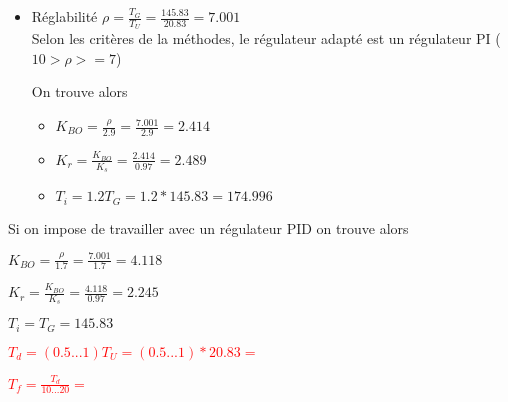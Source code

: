 \begin{itemize}
\item Réglabilité $\rho = \frac{T_{G}}{T_{U}} = \frac{145.83}{20.83} = 7.001$\\
Selon les critères de la méthodes, le régulateur adapté est un régulateur PI ($10 > \rho >= 7$)

On trouve alors 
\begin{itemize}
\item $K_{BO} = \frac{\rho}{2.9} = \frac{7.001}{2.9} = 2.414$
\item $K_{r} = \frac{K_{BO}}{K_{s}} = \frac{2.414}{0.97} = 2.489$
\item $T_{i} = 1.2T_{G} = 1.2*145.83 = 174.996$
\end{itemize}
\end{itemize}

Si on impose de travailler avec un régulateur PID on trouve alors 
\begin{itemize}
\item $K_{BO} = \frac{\rho}{1.7} = \frac{7.001}{1.7} = 4.118$
\item $K_{r} = \frac{K_{BO}}{K_{s}} = \frac{4.118}{0.97} = 2.245$
\item $T_{i} = T_{G} = 145.83$

\textcolor{red}{\item $T_{d} = (0.5...1)T_{U} = (0.5...1)*20.83 = $
\item $T_{f} = \frac{T_{d}}{10...20} = $}
\end{itemize}
